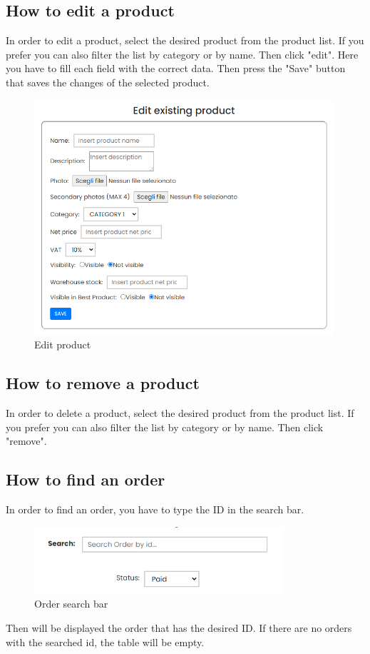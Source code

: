 \subsection{How to edit a product}\label{_editProduct}
In order to edit a product, select the desired product from the product list. If you prefer you can also filter the list by category or by name. Then click "edit".
Here you have to fill each field with the correct data. Then press the "Save" button that saves the changes of the selected product.
\begin{figure}[H]
    \centering
    \includegraphics[width=30em]{res/images/venditore/editproduct.png}
    \caption{Edit product}
\end{figure}

\subsection{How to remove a product}\label{_removeProduct}
In order to delete a product, select the desired product from the product list. If you prefer you can also filter the list by category or by name. Then click "remove".

\subsection{How to find an order}\label{_findOrder}
In order to find an order, you have to type the ID in the search bar.
\begin{figure}[H]
    \centering
    \includegraphics[width=25em]{res/images/venditore/orderbar.png}
    \caption{Order search bar}
\end{figure}
Then will be displayed the order that has the desired ID. If there are no orders with the searched id, the table will be empty.

